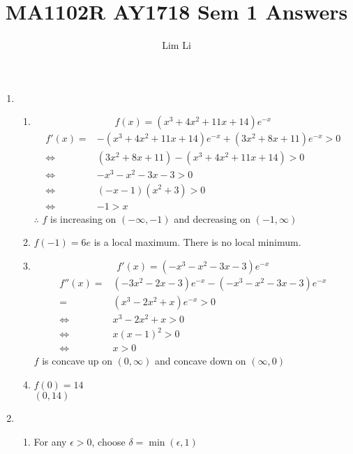 \documentclass[12pt]{article}
\theoremstyle{definition}
\begin{document}
\title{MA1102R AY1718 Sem 1 Answers}
\author{Lim Li}
\maketitle
\begin{enumerate}
  \item \begin{enumerate}[label=(\roman*)]
          \item \[f(x)=(x^3+4x^2+11x+14)e^{-x}\]
		        \begin{align*}
		          f'(x) =& -(x^3+4x^2+11x+14)e^{-x} + (3x^2+8x+11)e^{-x} > 0 \\
		            \iff & (3x^2+8x+11) - (x^3+4x^2+11x+14) > 0 \\
		            \iff & -x^3 -x^2 - 3x - 3 > 0 \\
		            \iff & (-x-1)(x^2+3) > 0 \\
		            \iff & -1 > x
		        \end{align*}
		        $\therefore$ $f$ is increasing on $(-\infty,-1)$ and decreasing on $(-1,\infty)$
		  \item $f(-1)=6e$ is a local maximum. There is no local minimum.
		  \item \[f'(x)=(-x^3-x^2-3x-3)e^{-x}\]
		        \begin{align*}
		          f''(x) =& (-3x^2-2x-3)e^{-x} - (-x^3-x^2-3x-3)e^{-x} \\
		                 =& (x^3 -2x^2 +x)e^{-x} > 0 \\
		             \iff & x^3 -2x^2 + x > 0 \\
		             \iff & x(x-1)^2 > 0 \\
		             \iff & x > 0
		        \end{align*}
		        $f$ is concave up on $(0,\infty)$ and concave down on $(\infty,0)$
		  \item $f(0)=14$ \\
		        $(0,14)$
        \end{enumerate}
  \item \begin{enumerate}[label=(\alph*)]
          \item For any $\epsilon > 0$, choose $\delta = \min(\epsilon,1)$
                

\end{enumerate}
\end{enumerate}
\end{document}
